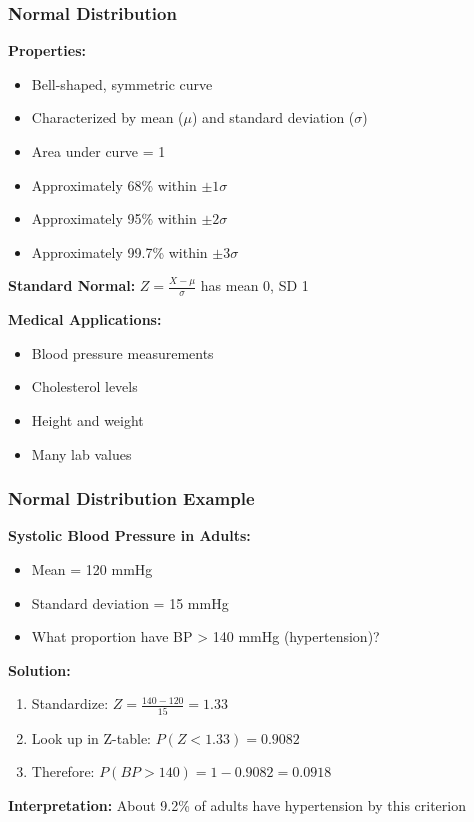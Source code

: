 \documentclass{beamer}
\begin{document}
\begin{frame}
\frametitle{Normal Distribution}
\textbf{Properties:}
\begin{itemize}
\item Bell-shaped, symmetric curve
\item Characterized by mean ($\mu$) and standard deviation ($\sigma$)
\item Area under curve = 1
\item Approximately 68\% within $\pm 1\sigma$
\item Approximately 95\% within $\pm 2\sigma$
\item Approximately 99.7\% within $\pm 3\sigma$
\end{itemize}

\vspace{0.5cm}
\textbf{Standard Normal:} $Z = \frac{X - \mu}{\sigma}$ has mean 0, SD 1

\vspace{0.5cm}
\textbf{Medical Applications:}
\begin{itemize}
\item Blood pressure measurements
\item Cholesterol levels
\item Height and weight
\item Many lab values
\end{itemize}
\end{frame}

\begin{frame}
\frametitle{Normal Distribution Example}
\textbf{Systolic Blood Pressure in Adults:}
\begin{itemize}
\item Mean = 120 mmHg
\item Standard deviation = 15 mmHg
\item What proportion have BP > 140 mmHg (hypertension)?
\end{itemize}

\vspace{0.5cm}
\textbf{Solution:}
\begin{enumerate}
\item Standardize: $Z = \frac{140 - 120}{15} = 1.33$
\item Look up in Z-table: $P(Z < 1.33) = 0.9082$
\item Therefore: $P(BP > 140) = 1 - 0.9082 = 0.0918$
\end{enumerate}

\vspace{0.5cm}
\textbf{Interpretation:} About 9.2\% of adults have hypertension by this criterion
\end{frame}
\end{document}
